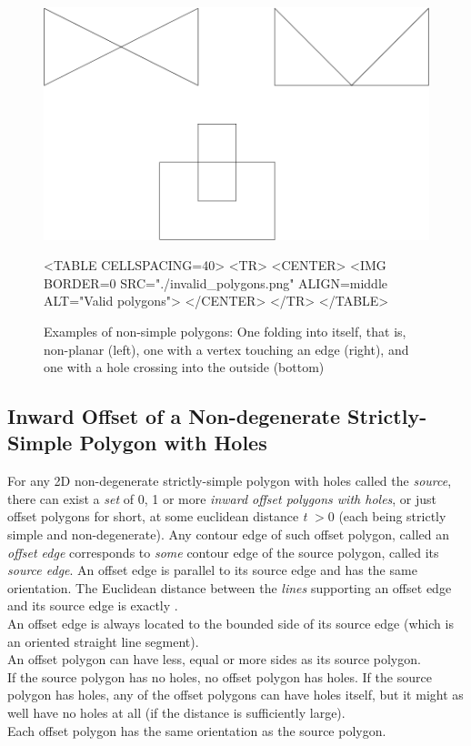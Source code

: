 \begin{figure}[htbp]
\begin{ccTexOnly}
\begin{center}
\includegraphics{Straight_skeleton_2/invalid_polygons} %
\end{center}
\end{ccTexOnly}
\begin{ccHtmlOnly}
<TABLE CELLSPACING=40>
<TR>
<CENTER>
<IMG BORDER=0 SRC="./invalid_polygons.png" ALIGN=middle ALT="Valid polygons">
</CENTER>
</TR>
</TABLE>
\end{ccHtmlOnly}
\caption{Examples of non-simple polygons: One folding into itself, that is, non-planar (left), one with a vertex touching an edge (right), and one with a hole crossing into the outside (bottom)
\label{Invalid-polygons}}
\end{figure}

\subsection{Inward Offset of a Non-degenerate Strictly-Simple Polygon with Holes}

For any 2D non-degenerate strictly-simple polygon with holes called the {\em source}, there can exist a \textit{set} of 0, 1 or more {\em inward offset polygons with holes}, or just offset polygons for short, at some euclidean distance \textit{t} $>0$ (each being strictly simple and non-degenerate). Any contour edge of such offset polygon, called an {\em offset edge} corresponds to \textit{some} contour edge of the source polygon, called its {\em source edge}. An offset edge is parallel to its source edge and has the same orientation. The Euclidean distance between the \textit{lines} supporting an offset edge and its source edge is exactly .\\
An offset edge is always located to the bounded side of its source edge (which is an oriented straight line segment).\\
An offset polygon can have less, equal or more sides as its source polygon.\\
If the source polygon has no holes, no offset polygon has holes. If the source polygon has holes, any of the offset polygons can have holes itself, but it might as well have no holes at all (if the distance is sufficiently large).\\
Each offset polygon has the same orientation as the source polygon.

